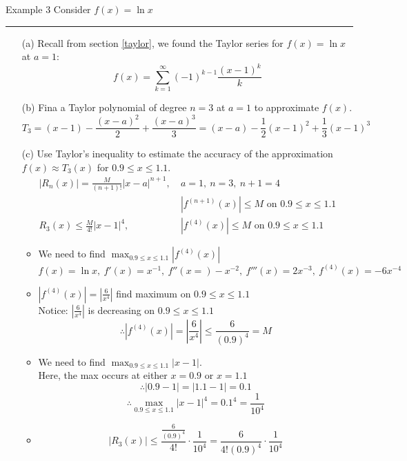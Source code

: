 \documentclass[12pt,a4paper]{article}
\begin{document}
\begin{eg}{Example 3}
	Consider $f(x)=\ln{x}$\\
	\noindent\rule[0.25\baselineskip]{\textwidth}{1pt}
	\begin{enumerate}
		\item[(a)] Recall from section \ref{taylor}, we found the Taylor series for $f(x)=\ln{x}$ at $a=1$: $$f(x)=\sum^\infty_{k=1}(-1)^{k-1}\frac{(x-1)^k}{k}$$
		\item[(b)] Fina a Taylor polynomial of degree $n=3$ at $a=1$ to approximate $f(x).$ $$T_3=(x-1)-\frac{(x-a)^2}{2}+\frac{(x-a)^3}{3}=(x-a)-\frac{1}{2}(x-1)^2+\frac{1}{3}(x-1)^3$$
		\item[(c)] Use Taylor's inequality to estimate the accuracy of the approximation $f(x)\approx T_3(x)$ for $0.9\leq x\leq1.1.$ 
		$$\begin{aligned}
			|R_n(x)|=\frac{M}{(n+1)!}|x-a|^{n+1},\ &a=1,\ n=3,\ n+1=4\\
			&|f^{(n+1)}(x)|\leq M\text{ on }0.9\leq x\leq 1.1\\
			R_3(x)\leq\frac{M}{4!}|x-1|^4,\ &|f^{(4)}(x)|\leq M\text{ on }0.9\leq x\leq 1.1
		\end{aligned}$$
		\begin{itemize}
			\item We need to find $\displaystyle\max_{0.9\leq x\leq1.1}|f^{(4)}(x)|$ $$f(x)=\ln{x},\ f'(x)=x^{-1},\ f''(x=)-x^{-2},\ f'''(x)=2x^{-3},\ f^{(4)}(x)=-6x^{-4}$$
			\item $\displaystyle |f^{(4)}(x)|=\left|\frac{6}{x^4}\right|$ find maximum on $0.9\leq x\leq 1.1$\\
			Notice: $\displaystyle\left|\frac{6}{x^4}\right|$ is decreasing on $0.9\leq x\leq 1.1$
			$$\therefore|f^{(4)}(x)|=\left|\frac{6}{x^4}\right|\leq\frac{6}{(0.9)^4}=M$$
			\item We need to find $\displaystyle\max_{0.9\leq x\leq 1.1}|x-1|$.\\
			Here, the max occurs at either $x=0.9$ or $x=1.1$
			$$\therefore|0.9-1|=|1.1-1|=0.1$$
			$$\therefore\max_{0.9\leq x\leq1.1}|x-1|^4=0.1^4=\frac{1}{10^4}$$
			\item $$|R_3(x)|\leq\frac{\frac{6}{(0.9)^4}}{4!}\cdot\frac{1}{10^4}=\frac{6}{4!(0.9)^4}\cdot\frac{1}{10^4}$$
		\end{itemize}
	\end{enumerate}
\end{eg}
\end{document}

